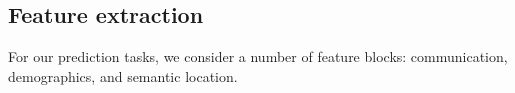 \documentclass[acmlarge]{acmart}
\begin{document}



\subsection{Feature extraction}
\label{subsec:feature_extract}
For our prediction tasks, we consider a number of feature blocks: communication, demographics, and semantic location.
\end{document}
